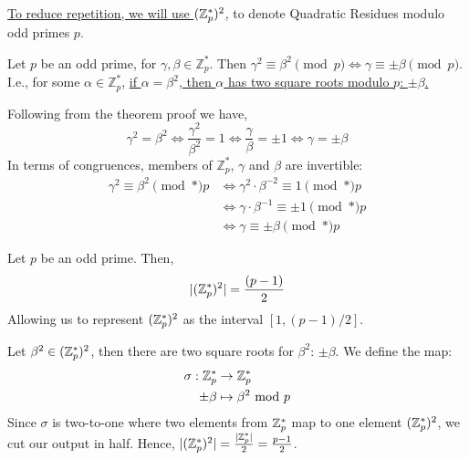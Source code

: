 \newpage

\noindent
\underline{To reduce repetition, we will use $(\mathbb{Z}_p^*)^2$,} to denote Quadratic Residues modulo odd primes $p$.
\begin{theo}
    
        Let $p$ be an odd prime, for $\gamma,\beta\in\mathbb{Z}_p^*$. Then $\gamma^2\equiv\beta^2\pmod{p}\Longleftrightarrow\gamma\equiv\pm\beta\pmod{p}$.\\
        I.e., for some $\alpha\in\mathbb{Z}_p^*$, \underline{if $\alpha=\beta^2$, then $\alpha$ has two square roots modulo $p$: $\pm\beta$.}
\end{theo}
\begin{Proof}
Following from the theorem proof we have,
\[\gamma^2 = \beta^2 \iff \frac{\gamma^2}{\beta^2} = 1 \iff \frac{\gamma}{\beta} = \pm 1 \iff \gamma = \pm \beta\]  
In terms of congruences, members of $\mathbb{Z}_p^*$, $\gamma$ and $\beta$ are invertible:
\begin{align*} 
\gamma^2 \equiv \beta^2 \pmod*{p} &\iff \gamma^2\cdot\beta^{-2} \equiv 1 \pmod*{p}\\
&\iff \gamma\cdot\beta^{-1} \equiv \pm 1 \pmod*{p}\\
&\iff \gamma \equiv \pm \beta \pmod*{p}
\end{align*}

\noindent

\end{Proof}

\begin{theo}
    
    Let $p$ be an odd prime. Then,
     \Large\[|(\mathbb{Z}_p^*)^2|=\frac{(p-1)}{2}
     \]
     \normalsize
     \noindent
     Allowing us to represent $(\mathbb{Z}_p^*)^2$ as the interval $[1,(p-1)/2]$.
\end{theo}

\begin{Proof}
    Let $\beta^2\in(\mathbb{Z}_p^*)^2$, then there are two square roots for $\beta^2$: $\pm\beta$. We define the map:
    \begin{align*}
        \sigma: \mathbb{Z}_p^* &\to \mathbb{Z}_p^*\\
        \pm\beta &\mapsto \beta^2 \text{ mod } p
    \end{align*}
    Since $\sigma$ is two-to-one where two elements from $\mathbb{Z}_p^*$ map to one element $(\mathbb{Z}_p^*)^2$, we cut our output in half.
    Hence, $|(\mathbb{Z}_p^*)^2|=\frac{|\mathbb{Z}_p^*|}{2}=\frac{p-1}{2}$.
\end{Proof}

